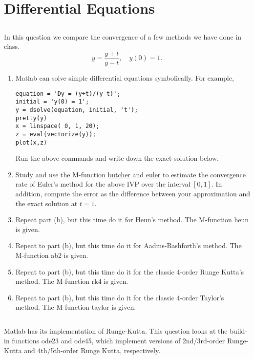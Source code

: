 \chapter{Differential Equations}

\section{}
In this question we compare the convergence of a few methods we have done in class.
\[ \dot{y}=\frac{y+t}{y-t}, \quad y(0)=1. \]
\begin{enumerate}
	\item Matlab can solve simple differential equations symbolically.
	For example,
	\begin{lstlisting}[style=Matlab-editor]
equation = 'Dy = (y+t)/(y-t)';
initial = 'y(0) = 1';
y = dsolve(equation, initial, 't');
pretty(y)
x = linspace( 0, 1, 20);
z = eval(vectorize(y));
plot(x,z)
	\end{lstlisting}
	Run the above commands and write down the exact solution below.
	\item Study and use the M-function \hyperref[butcher]{butcher} and \hyperref[euler]{euler} to estimate the convergence rate of Euler's method for the above IVP over the interval \([0, 1]\).
	In addition, compute the error as the difference between your approximation and the exact solution at \(t = 1\).
	\item Repeat part (b), but this time do it for Heun's method.
	The M-function heun is given.

	\item Repeat to part (b), but this time do it for Aadms-Bashforth's method.
	The M-function ab2 is given.

	\item Repeat to part (b), but this time do it for the classic 4-order Runge Kutta's method.
	The M-function rk4 is given.

	\item Repeat to part (b), but this time do it for the classic 4-order Taylor's method.
	The M-function taylor is given.

\end{enumerate}


\section{}
Matlab has its implementation of Runge-Kutta.
This question looks at the build-in functions ode23 and ode45, which implement versions of 2nd/3rd-order Runge-Kutta and 4th/5th-order Runge Kutta, respectively.